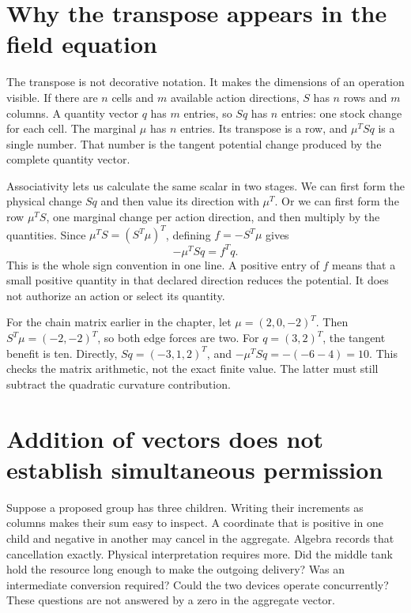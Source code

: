 \section{Why the transpose appears in the field equation}
The transpose is not decorative notation. It makes the dimensions of an
operation visible. If there are $n$ cells and $m$ available action directions,
$S$ has $n$ rows and $m$ columns. A quantity vector $q$ has $m$ entries,
so $Sq$ has $n$ entries: one stock change for each cell. The marginal
$\mu$ has $n$ entries. Its transpose is a row, and $\mu^TSq$ is a
single number. That number is the tangent potential change produced by
the complete quantity vector.

Associativity lets us calculate the same scalar in two stages. We can first
form the physical change $Sq$ and then value its direction with $\mu^T$.
Or we can first form the row $\mu^TS$, one marginal change per action
direction, and then multiply by the quantities. Since
$\mu^TS=(S^T\mu)^T$, defining $f=-S^T\mu$ gives
\begin{equation}
 -\mu^TSq=f^Tq.
\end{equation}
This is the whole sign convention in one line. A positive entry of $f$
means that a small positive quantity in that declared direction reduces
the potential. It does not authorize an action or select its quantity.

For the chain matrix earlier in the chapter, let
$\mu=(2,0,-2)^T$. Then $S^T\mu=(-2,-2)^T$, so both edge forces
are two. For $q=(3,2)^T$, the tangent benefit is ten. Directly,
$Sq=(-3,1,2)^T$, and $-\mu^TSq=-(-6-4)=10$.
This checks the matrix arithmetic, not the exact finite value. The latter
must still subtract the quadratic curvature contribution.

\section{Addition of vectors does not establish simultaneous permission}
Suppose a proposed group has three children. Writing their increments as
columns makes their sum easy to inspect. A coordinate that is positive in
one child and negative in another may cancel in the aggregate. Algebra
records that cancellation exactly. Physical interpretation requires more.
Did the middle tank hold the resource long enough to make the outgoing
delivery? Was an intermediate conversion required? Could the two devices
operate concurrently? These questions are not answered by a zero in the
aggregate vector.


